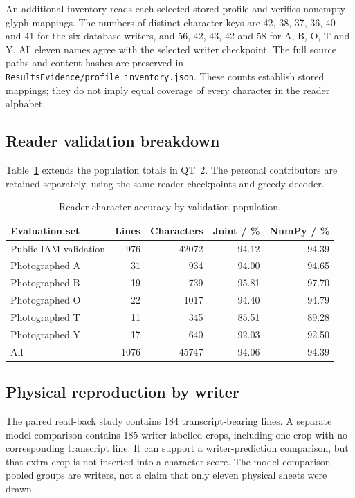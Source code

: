 An additional inventory reads each selected stored profile and verifies nonempty glyph mappings. The numbers of distinct character keys are 42, 38, 37, 36, 40 and 41 for the six database writers, and 56, 42, 43, 42 and 58 for A, B, O, T and Y. All eleven names agree with the selected writer checkpoint. The full source paths and content hashes are preserved in \texttt{ResultsEvidence/profile\_inventory.json}. These counts establish stored mappings; they do not imply equal coverage of every character in the reader alphabet.

\subsection{Reader validation breakdown}
Table~\ref{tab:app-reader-breakdown} extends the population totals in QT~2. The personal contributors are retained separately, using the same reader checkpoints and greedy decoder.
\begin{table}[!htbp]\centering\small
\begin{tabular}{lrrrr}\toprule
\textbf{Evaluation set} & \textbf{Lines} & \textbf{Characters} & \textbf{Joint / \%} & \textbf{NumPy / \%}\\\midrule
Public IAM validation & 976 & 42072 & 94.12 & 94.39\\
Photographed A & 31 & 934 & 94.00 & 94.65\\
Photographed B & 19 & 739 & 95.81 & 97.70\\
Photographed O & 22 & 1017 & 94.40 & 94.79\\
Photographed T & 11 & 345 & 85.51 & 89.28\\
Photographed Y & 17 & 640 & 92.03 & 92.50\\
All & 1076 & 45747 & 94.06 & 94.39\\
\bottomrule\end{tabular}
\caption{Reader character accuracy by validation population.}\label{tab:app-reader-breakdown}
\end{table}

\subsection{Physical reproduction by writer}

The paired read-back study contains 184 transcript-bearing lines. A separate model comparison contains 185 writer-labelled crops, including one crop with no corresponding transcript line. It can support a writer-prediction comparison, but that extra crop is not inserted into a character score. The model-comparison pooled groups are writers, not a claim that only eleven physical sheets were drawn.



